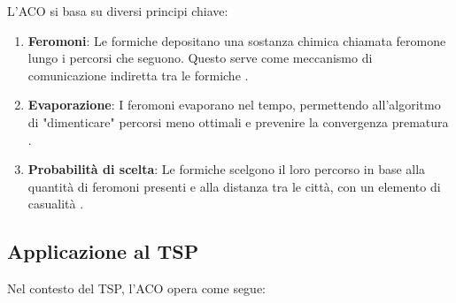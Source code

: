 L'\Gls{ACO} si basa su diversi principi chiave:

\begin{enumerate}
	\item \textbf{Feromoni}: Le formiche depositano una sostanza chimica chiamata feromone lungo i percorsi che seguono. Questo serve come meccanismo di comunicazione indiretta tra le formiche \cite{dorigo2006ant}.
	\item \textbf{Evaporazione}: I feromoni evaporano nel tempo, permettendo all'algoritmo di "dimenticare" percorsi meno ottimali e prevenire la convergenza prematura \cite{stutzle2000max}.
	\item \textbf{Probabilità di scelta}: Le formiche scelgono il loro percorso in base alla quantità di feromoni presenti e alla distanza tra le città, con un elemento di casualità \cite{dorigo2004ant}.
\end{enumerate}

\subsection{Applicazione al \Gls{TSP}}

Nel contesto del \Gls{TSP}, l'ACO opera come segue:

